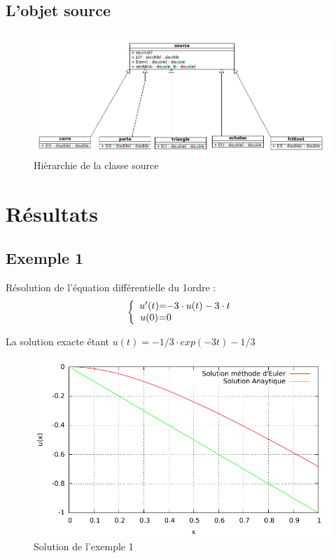 \documentclass[a4paper,11pt]{article}
\begin{document}
  \subsection{L'objet source}
    \begin{figure}[H]
	 \begin{center}
	\includegraphics[scale=.7]{sourceDiagram}
	\caption{Hièrarchie de la classe source}
	\end{center}
      \end{figure}
\newpage


\section{Résultats}
  \subsection{Exemple 1}
Résolution de l'équation différentielle du 1\ier ordre :
\begin{equation*}
 \left \{
  \begin{array}{c @{=} l}
    u'(t) & -3\cdot u(t)-3\cdot t
\\
   u(0) & 0
  \end{array}
\right.
\end{equation*} 

La solution exacte étant $u(t)=-1/3\cdot exp(-3t)-1/3$
  \begin{figure}[H]
	 \begin{center}
	\includegraphics[scale=1]{exemple1}
	\caption{Solution de l'exemple 1}
	\end{center}
      \end{figure}
\end{document}
